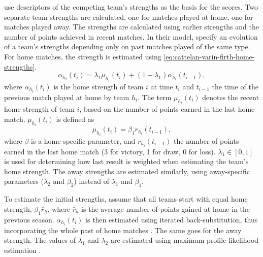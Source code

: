 \citet{bib:cattelan-varin-firth-2013} use descriptors of the competing team's strengths as the basis for the scores. Two separate team strengths are calculated, one for matches played at home, one for matches played away. The strengths are calculated using earlier strengths and the number of points achieved in recent matches. In their model, \citet{bib:cattelan-varin-firth-2013} specify an evolution of a team's strengths depending only on past matches played of the same type. For home matches, the strength is estimated using \cref{eq:cattelan-varin-firth-home-strengths}.
\begin{equation}
    \alpha_{h_{i}}(t_{i}) = \lambda_{1} \mu_{h_{i}}(t_{i}) + (1 - \lambda_{1}) \alpha_{h_{i}}(t_{i-1}),
    \label{eq:cattelan-varin-firth-home-strengths}
\end{equation}
where $\alpha_{h_{i}}(t_{i})$ is the home strength of team $i$ at time $t_{i}$ and $t_{i-1}$ the time of the previous match played at home by team $h_{i}$. The term $\mu_{h_{i}}(t_{i})$ denotes the recent home strength of team $i$, based on the number of points earned in the last home match. $\mu_{h_{i}}(t_{i})$ is defined as
\begin{equation*}
    \mu_{h_{i}}(t_{i}) = \beta_{1} r_{h_{i}}(t_{i-1}),
\end{equation*}
where $\beta$ is a home-specific parameter, and $r_{h_{i}}(t_{i-1})$ the number of points earned in the last home match (3 for victory, 1 for draw, 0 for loss). $\lambda_{1} \in [0, 1]$ is used for determining how last result is weighted when estimating the team's home strength. The away strengths are estimated similarly, using away-specific parameters ($\lambda_{2}$ and $\beta_{2}$) instead of $\lambda_{1}$ and $\beta_{1}$.

To estimate the initial strengths, \citet{bib:cattelan-varin-firth-2013} assume that all teams start with equal home strength, $\beta_{1} \bar{r}_{h}$, where $\bar{r}_{h}$ is the average number of points gained at home in the previous season. $\alpha_{h_{i}}(t_{i})$ is then estimated using iterated back-substitution, thus incorporating the whole past of home matches \citep{bib:cattelan-varin-firth-2013}. The same goes for the away strength. The values of $\lambda_{1}$ and $\lambda_{2}$ are estimated using maximum profile likelihood estimation \citep{bib:cattelan-varin-firth-2013}.


